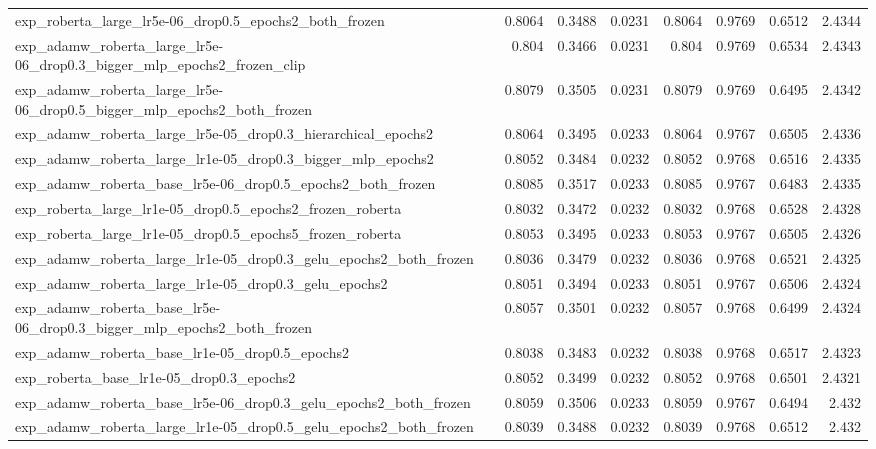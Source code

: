 \documentclass[a4paper,oneside,bibliography=totoc]{scrbook}
\begin{document}
\begin{landscape}
\begin{center}
\begin{longtable}{p{4cm} *{7}{r}}
        exp\_roberta\_large\_lr5e-06\_drop0.5\_epochs2\_both\_frozen & 0.8064 & 0.3488 & 0.0231 & 0.8064 & 0.9769 & 0.6512 & 2.4344 \\ 
        exp\_adamw\_roberta\_large\_lr5e-06\_drop0.3\_bigger\_mlp\_epochs2\_frozen\_clip & 0.804 & 0.3466 & 0.0231 & 0.804 & 0.9769 & 0.6534 & 2.4343 \\ 
        exp\_adamw\_roberta\_large\_lr5e-06\_drop0.5\_bigger\_mlp\_epochs2\_both\_frozen & 0.8079 & 0.3505 & 0.0231 & 0.8079 & 0.9769 & 0.6495 & 2.4342 \\ 
        exp\_adamw\_roberta\_large\_lr5e-05\_drop0.3\_hierarchical\_epochs2 & 0.8064 & 0.3495 & 0.0233 & 0.8064 & 0.9767 & 0.6505 & 2.4336 \\ 
        exp\_adamw\_roberta\_large\_lr1e-05\_drop0.3\_bigger\_mlp\_epochs2 & 0.8052 & 0.3484 & 0.0232 & 0.8052 & 0.9768 & 0.6516 & 2.4335 \\ 
        exp\_adamw\_roberta\_base\_lr5e-06\_drop0.5\_epochs2\_both\_frozen & 0.8085 & 0.3517 & 0.0233 & 0.8085 & 0.9767 & 0.6483 & 2.4335 \\ 
        exp\_roberta\_large\_lr1e-05\_drop0.5\_epochs2\_frozen\_roberta & 0.8032 & 0.3472 & 0.0232 & 0.8032 & 0.9768 & 0.6528 & 2.4328 \\ 
        exp\_roberta\_large\_lr1e-05\_drop0.5\_epochs5\_frozen\_roberta & 0.8053 & 0.3495 & 0.0233 & 0.8053 & 0.9767 & 0.6505 & 2.4326 \\ 
        exp\_adamw\_roberta\_large\_lr1e-05\_drop0.3\_gelu\_epochs2\_both\_frozen & 0.8036 & 0.3479 & 0.0232 & 0.8036 & 0.9768 & 0.6521 & 2.4325 \\ 
        exp\_adamw\_roberta\_large\_lr1e-05\_drop0.3\_gelu\_epochs2 & 0.8051 & 0.3494 & 0.0233 & 0.8051 & 0.9767 & 0.6506 & 2.4324 \\ 
        exp\_adamw\_roberta\_base\_lr5e-06\_drop0.3\_bigger\_mlp\_epochs2\_both\_frozen & 0.8057 & 0.3501 & 0.0232 & 0.8057 & 0.9768 & 0.6499 & 2.4324 \\ 
        exp\_adamw\_roberta\_base\_lr1e-05\_drop0.5\_epochs2 & 0.8038 & 0.3483 & 0.0232 & 0.8038 & 0.9768 & 0.6517 & 2.4323 \\ 
        exp\_roberta\_base\_lr1e-05\_drop0.3\_epochs2 & 0.8052 & 0.3499 & 0.0232 & 0.8052 & 0.9768 & 0.6501 & 2.4321 \\ 
        exp\_adamw\_roberta\_base\_lr5e-06\_drop0.3\_gelu\_epochs2\_both\_frozen & 0.8059 & 0.3506 & 0.0233 & 0.8059 & 0.9767 & 0.6494 & 2.432 \\ 
        exp\_adamw\_roberta\_large\_lr1e-05\_drop0.5\_gelu\_epochs2\_both\_frozen & 0.8039 & 0.3488 & 0.0232 & 0.8039 & 0.9768 & 0.6512 & 2.432 \\ 

\end{longtable}
\end{center}
\end{landscape}
\end{document}
